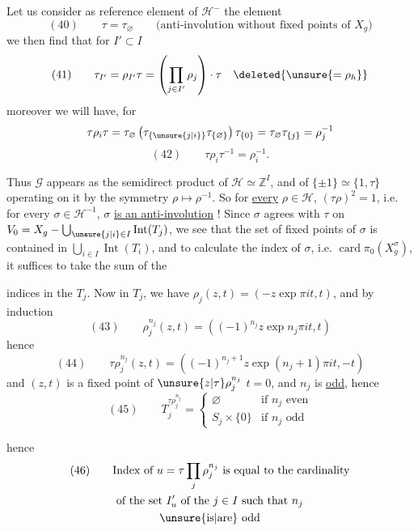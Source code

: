 
Let us consider as reference element of $\mathcal H^{-}$ the element
\[
(40)\qquad \tau=\tau_{\varnothing}\qquad
\text{(anti-involution without fixed points of $X_g$)}
\]
we then find  that for $I'\subset I$
\[
(41)\qquad \tau_{I'}=\rho_{I'}\tau=
\left(\prod_{j\in I'}\rho_j\right)\cdot\tau\quad
\deleted{\unsure{=\rho_h}}
\]
moreover we will have, for 
\[
\tau\rho_{i}\tau
=\tau_{\varnothing}\left(\tau_{\{\unsure{j|i}\}}\tau_{\{\varnothing\}}\right)
\tau_{\{0\}}
=\tau_{\varnothing}\tau_{\{j\}}=\rho_j^{-1}
\]
\[
(42)\qquad \tau\rho_{i}\tau^{-1}=\rho_{i}^{-1}.
\]

Thus $\mathcal G$ appears as the semidirect product of $\mathcal H\simeq\mathbb Z^I$, and of
$\{\pm1\}\simeq\{1,\tau\}$ operating on it by the symmetry
$\rho\longmapsto\rho^{-1}$. So for \uline{every} $\rho\in\mathcal H$,
$(\tau\rho)^2=1$, i.e. for every
$\sigma\in\mathcal H^{-1}$,
$\sigma$  \uline{is an anti-involution} !
Since $\sigma$ agrees with $\tau$ on
$V_0=X_g-\bigcup_{\unsure{j|i}\in I}\operatorname{Int}(T_j)$,
we see that the set of fixed points of $\sigma$ is contained in
$\bigcup_{i\in I}\operatorname{Int}(T_i)$, and to calculate the index of $\sigma$,
i.e. $\operatorname{card}\pi_0(X_g^\sigma)$, it suffices to take the sum of the


indices in the $T_j$. Now in $T_j$, we have 
$\rho_j(z,t)=(-z\exp\pi it,t)$, and by induction
\[
(43)\qquad \rho_j^{n_j}(z,t)=\left((-1)^{n_j}z\exp n_j\pi it,t\right)
\]
hence
\[
(44)\qquad \tau\rho_j^{n_j}(z,t)=
\left((-1)^{n_j+1}z\exp(n_j+1)\pi it,-t\right)
\]
and  $(z,t)$ is a fixed point of
$\unsure{z|\tau}\rho_j^{n_j}$ 
$t=0$,  and $n_j$ is \uline{odd}, hence
\[
(45)\qquad T_j^{\tau\rho_j^{n_j}}=
\begin{cases}
\varnothing&\text{if $n_j$ even}\\
S_j\times\{0\}&\text{if $n_j$ odd}
\end{cases}
\]

hence
\[
\begin{gathered}
(46)\qquad \text{Index of }u=\tau\prod_j\rho_j^{n_j}\text{ is equal to the cardinality}\\
\text{of the set }I'_u\text{ of the }j\in I\text{ such that }n_j\\
\text{\unsure{is|are} odd}
\end{gathered}
\]

